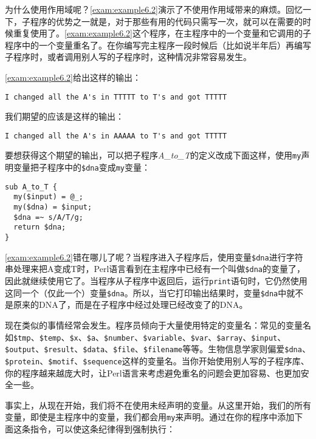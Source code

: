 为什么使用作用域呢？\autoref{exam:example6.2}演示了不使用作用域带来的麻烦。回忆一下，子程序的优势之一就是，对于那些有用的代码只需写一次，就可以在需要的时候重复使用了。\autoref{exam:example6.2}这个程序，在主程序中的一个变量和它调用的子程序中的一个变量重名了。在你编写完主程序一段时候后（比如说半年后）再编写子程序时，或者调用别人写的子程序时，这种情况非常容易发生。



\autoref{exam:example6.2}给出这样的输出：

\begin{lstlisting}
I changed all the A's in TTTTT to T's and got TTTTT 
\end{lstlisting}

我们期望的应该是这样的输出：

\begin{lstlisting}
I changed all the A's in AAAAA to T's and got TTTTT 
\end{lstlisting}

要想获得这个期望的输出，可以把子程序\textit{A\_to\_T}的定义改成下面这样，使用\verb|my|声明变量把子程序中的\verb|$dna|变成\verb|my|变量：

\begin{lstlisting}
sub A_to_T {
  my($input) = @_;
  my($dna) = $input;
  $dna =~ s/A/T/g;
  return $dna;
}
\end{lstlisting}

\autoref{exam:example6.2}错在哪儿了呢？当程序进入子程序后，使用变量\verb|$dna|进行字符串处理来把A变成T时，Perl语言看到在主程序中已经有一个叫做\verb|$dna|的变量了，因此就继续使用它了。当程序从子程序中返回后，运行\verb|print|语句时，它仍然使用这同一个（仅此一个）变量\verb|$dna|。所以，当它打印输出结果时，变量\verb|$dna|中就不是原来的DNA了，而是在子程序中经过处理已经改变了的DNA。

现在类似的事情经常会发生。程序员倾向于大量使用特定的变量名：常见的变量名如\verb|$tmp|、\verb|$temp|、\verb|$x|、\verb|$a|、\verb|$number|、\verb|$variable|、\verb|$var|、\verb|$array|、\verb|$input|、\verb|$output|、\verb|$result|、\verb|$data|、\verb|$file|、\verb|$filename|等等。生物信息学家则偏爱\verb|$dna|、\verb|$protein|、\verb|$motif|、\verb|$sequence|这样的变量名。当你开始使用别人写的子程序库、你的程序越来越庞大时，让Perl语言来考虑避免重名的问题会更加容易、也更加安全一些。

事实上，从现在开始，我们将不在使用未经声明的变量。从这里开始，我们的所有变量，即使是主程序中的变量，我们都会用\verb|my|来声明。通过在你的程序中添加下面这条指令，可以使这条纪律得到强制执行：

